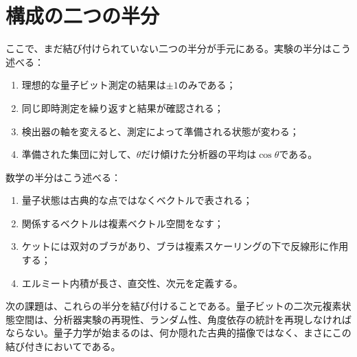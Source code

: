 \begin{classroomqa}
\end{classroomqa}

\section{構成の二つの半分}

ここで、まだ結び付けられていない二つの半分が手元にある。実験の半分はこう述べる：
\begin{enumerate}
  \item 理想的な量子ビット測定の結果は\(\pm1\)のみである；
  \item 同じ即時測定を繰り返すと結果が確認される；
  \item 検出器の軸を変えると、測定によって準備される状態が変わる；
  \item 準備された集団に対して、\(\theta\)だけ傾けた分析器の平均は\(\cos\theta\)である。
\end{enumerate}
数学の半分はこう述べる：
\begin{enumerate}
  \item 量子状態は古典的な点ではなくベクトルで表される；
  \item 関係するベクトルは複素ベクトル空間をなす；
  \item ケットには双対のブラがあり、ブラは複素スケーリングの下で反線形に作用する；
  \item エルミート内積が長さ、直交性、次元を定義する。
\end{enumerate}

次の課題は、これらの半分を結び付けることである。量子ビットの二次元複素状態空間は、分析器実験の再現性、ランダム性、角度依存の統計を再現しなければならない。量子力学が始まるのは、何か隠れた古典的描像ではなく、まさにこの結び付きにおいてである。
